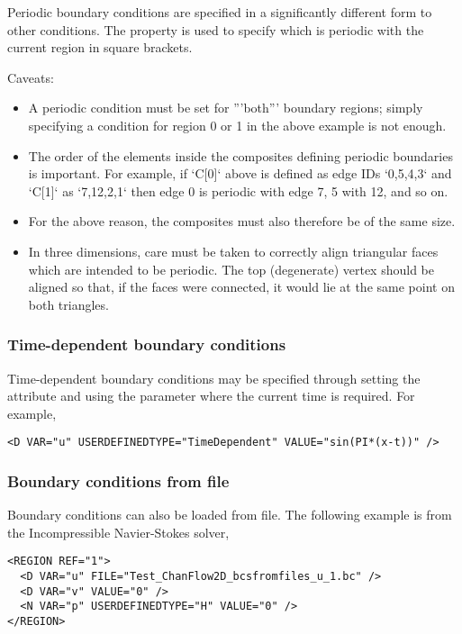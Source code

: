 Periodic boundary conditions are specified in a significantly different form to
other conditions. The  property is used to specify which
 is periodic with the current region in square brackets.

Caveats:
\begin{itemize}
\item A periodic condition must be set for '''both''' boundary regions; simply
 specifying a condition for region 0 or 1 in the above example is not enough.
\item The order of the elements inside the composites defining periodic
boundaries is important. For example, if `C[0]` above is defined as edge IDs 
`{0,5,4,3}` and `C[1]` as `{7,12,2,1}` then edge 0 is periodic with edge 7, 5 
with 12, and so on.
\item For the above reason, the composites must also therefore be of the same
size.
\item In three dimensions, care must be taken to correctly align triangular
faces which are intended to be periodic. The top (degenerate) vertex should be 
aligned so that, if the faces were connected, it would lie at the same point on 
both triangles.
\end{itemize}

\subsubsection{Time-dependent boundary conditions}
Time-dependent boundary conditions may be specified through setting the
 attribute and using the parameter  where the
current time is required. For example,
\begin{lstlisting}[style=XMLStyle]
<D VAR="u" USERDEFINEDTYPE="TimeDependent" VALUE="sin(PI*(x-t))" />
\end{lstlisting}

\subsubsection{Boundary conditions from file}
Boundary conditions can also be loaded from file. The following example is from
the Incompressible Navier-Stokes solver,
\begin{lstlisting}[style=XMLStyle]
<REGION REF="1">
  <D VAR="u" FILE="Test_ChanFlow2D_bcsfromfiles_u_1.bc" />
  <D VAR="v" VALUE="0" />
  <N VAR="p" USERDEFINEDTYPE="H" VALUE="0" />
</REGION>
\end{lstlisting}

